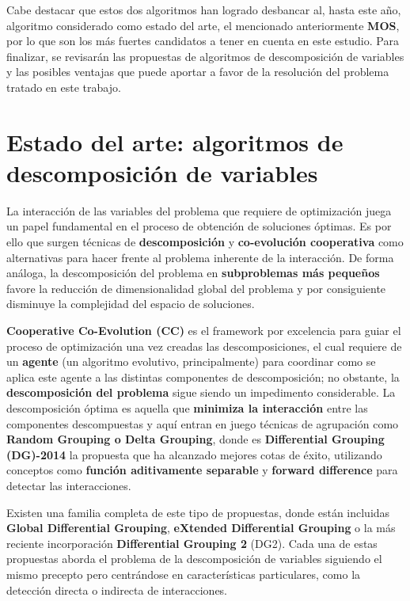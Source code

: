 Cabe destacar que estos dos algoritmos han logrado desbancar al, hasta este año, algoritmo considerado como estado del arte, el mencionado anteriormente \textbf{MOS}, por lo que son los más fuertes candidatos a tener en cuenta en este estudio. Para finalizar, se revisarán las propuestas de algoritmos de descomposición de variables y las posibles ventajas que puede aportar a favor de la resolución del problema tratado en este trabajo.

\section{Estado del arte: algoritmos de descomposición de variables}

La interacción de las variables del problema que requiere de optimización juega un papel fundamental en el proceso de obtención de soluciones óptimas. Es por ello que surgen técnicas de \textbf{descomposición} y \textbf{co-evolución cooperativa} como alternativas para hacer frente al problema inherente de la interacción. De forma análoga, la descomposición del problema en \textbf{subproblemas más pequeños} favore la reducción de dimensionalidad global del problema y por consiguiente disminuye la complejidad del espacio de soluciones.

\textbf{Cooperative Co-Evolution (CC)}\cite{CCoevo} es el framework por excelencia para guiar el proceso de optimización una vez creadas las descomposiciones, el cual requiere de un \textbf{agente} (un algoritmo evolutivo, principalmente) para coordinar como se aplica este agente a las distintas componentes de descomposición; no obstante, la \textbf{descomposición del problema} sigue siendo un impedimento considerable. La descomposición óptima es aquella que \textbf{minimiza la interacción} entre las componentes descompuestas y aquí entran en juego técnicas de agrupación como \textbf{Random Grouping o Delta Grouping}, donde es \textbf{Differential Grouping (DG)-2014} \cite{DG} la propuesta que ha alcanzado mejores cotas de éxito, utilizando conceptos como \textbf{función aditivamente separable} y \textbf{forward difference} para detectar las interacciones.

Existen una familia completa de este tipo de propuestas, donde están incluidas  \textbf{Global Differential Grouping}\cite{GDG}, \textbf{eXtended Differential Grouping}\cite{XDG} o la más reciente incorporación \textbf{Differential Grouping 2} (DG2)\cite{DG2}. Cada una de estas propuestas aborda el problema de la descomposición de variables siguiendo el mismo precepto pero centrándose en características particulares, como la detección directa o indirecta de interacciones. 

